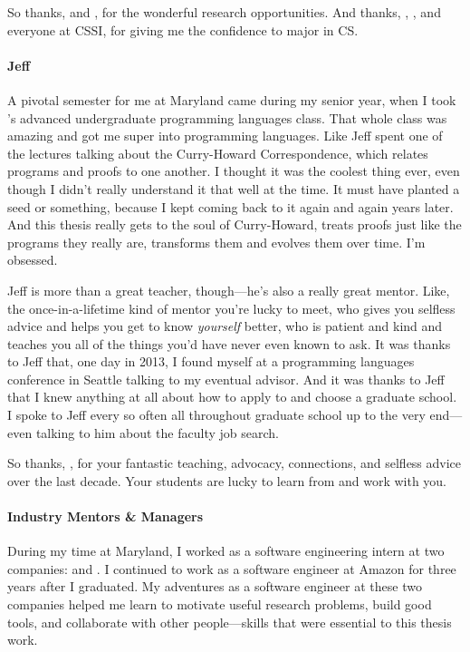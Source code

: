 So thanks,  and , for the wonderful research opportunities.
And thanks, , , and everyone at  CSSI, for giving me the confidence to major in CS.

\paragraph{Jeff}
A pivotal semester for me at Maryland came during my senior year, when I took 's advanced undergraduate programming languages class.
That whole class was amazing and got me super into programming languages.
Like Jeff spent one of the lectures talking about the Curry-Howard Correspondence,
which relates programs and proofs to one another.
I thought it was the coolest thing ever, even though I didn't really understand it that well at the time.
It must have planted a seed or something, because I kept coming back to it again and again years later.
And this thesis really gets to the soul of Curry-Howard, treats proofs just like the programs they really are,
transforms them and evolves them over time.
I'm obsessed.

Jeff is more than a great teacher, though---he's also a really great mentor.
Like, the once-in-a-lifetime kind of mentor you're lucky to meet, who gives you selfless advice and helps you get to know \textit{yourself} better,
who is patient and kind and teaches you all of the things you'd have never even known to ask.
It was thanks to Jeff that, one day in 2013, I found myself at a programming languages conference in Seattle talking to my eventual advisor.
And it was thanks to Jeff that I knew anything at all about how to apply to and choose a graduate school.
I spoke to Jeff every so often all throughout graduate school up to the very 
end---even talking to him about the faculty job search.

So thanks, , for your fantastic teaching, advocacy, connections, and selfless advice over the last decade.
Your students are lucky to learn from and work with you.

\paragraph{Industry Mentors \& Managers}
During my time at Maryland, I worked as a software engineering intern at two companies:
 and .
I continued to work as a software engineer at Amazon for three years after I graduated.
My adventures as a software engineer at these two companies helped me learn to motivate useful research problems,
build good tools, and collaborate with other people---skills that were essential to this thesis work.

